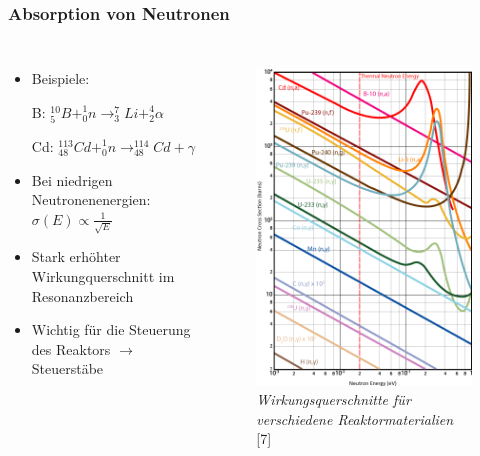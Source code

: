\documentclass{beamer}[9pt]
\begin{document}
\begin{frame}
\frametitle{Absorption von Neutronen}
\begin{columns}
\begin{itemize}
\item Beispiele:

\item[B:] $^{10}_5B + ^1_0n \rightarrow ^{7}_3Li + ^4_2\alpha$
\vspace{0.2cm}
\item[Cd:] $^{113}_{48}Cd + ^1_0n \rightarrow ^{114}_{48}Cd + \gamma$

\vspace{0.2cm}
\item Bei niedrigen Neutronenenergien: $\sigma(E) \propto  \frac{1}{\sqrt{E}}$
\item Stark erhöhter Wirkungquerschnitt im Resonanzbereich
\item Wichtig für die Steuerung des Reaktors $\rightarrow$ Steuerstäbe
\end{itemize}

\vspace{-1.2cm}
\begin{figure}
\includegraphics[scale=0.25]{multi_absorption_cs.jpg}\\
\textit{Wirkungsquerschnitte für verschiedene Reaktormaterialien} [7]
\end{figure}
\end{columns}
\end{frame}
\end{document}
